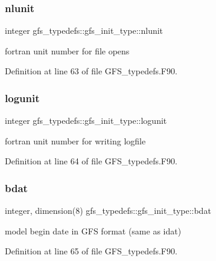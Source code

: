\subsubsection{nlunit}
{\footnotesize\ttfamily integer gfs\+\_\+typedefs\+::gfs\+\_\+init\+\_\+type\+::nlunit}



fortran unit number for file opens 



Definition at line 63 of file G\+F\+S\+\_\+typedefs.\+F90.

\mbox{\label{structgfs__typedefs_1_1gfs__init__type_a093c18d37849d55c4ad5364611511980}} 
\subsubsection{logunit}
{\footnotesize\ttfamily integer gfs\+\_\+typedefs\+::gfs\+\_\+init\+\_\+type\+::logunit}



fortran unit number for writing logfile 



Definition at line 64 of file G\+F\+S\+\_\+typedefs.\+F90.

\mbox{\label{structgfs__typedefs_1_1gfs__init__type_a04d31080068c1cdf6dde7391bc3c622d}} 
\subsubsection{bdat}
{\footnotesize\ttfamily integer, dimension(8) gfs\+\_\+typedefs\+::gfs\+\_\+init\+\_\+type\+::bdat}



model begin date in G\+FS format (same as idat) 



Definition at line 65 of file G\+F\+S\+\_\+typedefs.\+F90.

\mbox{\label{structgfs__typedefs_1_1gfs__init__type_a83c3e8f12ee78db9e6e7f15c3fb5ab89}} 
